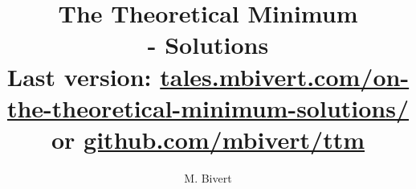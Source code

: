 
\author{M. Bivert}
\title{The Theoretical Minimum \\
	{\Large \vtitle{} - Solutions} \\
	{\footnotesize Last version: %
		\href{https://tales.mbivert.com/on-the-theoretical-minimum-solutions/}%
		{tales.mbivert.com/on-the-theoretical-minimum-solutions/} or %
		\href{https://github.com/mbivert/ttm}{github.com/mbivert/ttm}}
}

\usepackage{subfiles}

\usepackage[margin=1in]{geometry}
\usepackage{hyperref}

\setlength\parindent{0pt}

\usepackage{mathtools}
\usepackage{amsmath}
\usepackage{amsthm}
\usepackage{amsfonts}
\usepackage{bm}
\usepackage{amssymb}

\usepackage{stmaryrd}

\usepackage{float} %

\usepackage{tikz}
\usetikzlibrary{
	snakes,calc,patterns,angles,quotes,
	decorations.pathmorphing,math,
	decorations.pathreplacing,automata,
	arrows.meta,positioning,external
}
\usepackage{pgfplots}
\tikzexternalize[prefix=tikz/]
\pgfplotsset{compat=newest}

\usepackage{bashful}
\usepackage{listings}

\newcommand{\hr}{\noindent\rule{\textwidth}{0.4pt} \\}
\newcommand{\hrr}{\begin{center}\noindent\rule{0.5\textwidth}{0.4pt} \\\end{center}}

\newtheorem{axiom}{Axiom}
\newtheorem{definition}{Definition}
\newtheorem{remark}{Remark}
\newtheorem{theorem}{Theorem}
\newtheorem{lemma}{Lemma}
\newtheorem{exercise}{Exercise}
\newtheorem{example}{Example}

\newcommand{\bra}[1]{\langle #1|}
\newcommand{\ket}[1]{|#1\rangle}
\newcommand{\brah}[1]{\{#1|}
\newcommand{\keit}[1]{|#1\}}
\newcommand{\braket}[2]{\left\langle #1 \middle| #2 \right\rangle}
\newcommand{\ketbra}[2]{\left| #1 \right\rangle\left\langle #2 \right|}
\newcommand{\innerprod}[2]{\left\langle #1 , #2 \right\rangle}
\newcommand{\avg}[1]{\left\langle #1 \right\rangle}
\newcommand{\Tr}{\text{Tr}}
\newcommand\omicron{o}
\newcommand\Omicron{O}
\newcommand{\uvec}[1]{\bm{\hat{#1}}}
\newcommand{\norm}[1]{\lVert #1 \rVert}
\newcommand{\abs}[1]{\lvert #1 \rvert}
\newcommand{\harpoon}{\overset{\rightharpoonup}}
\newcommand{\intint}[1]{\llbracket #1 \rrbracket}

\newcommand{\xtitle}{\title{The Theoretical Minimum \\
	{\Large \vtitle{} - Solutions} \\
	{\large \jobname} \\
	{\footnotesize Last version: %
		\href{https://tales.mbivert.com/on-the-theoretical-minimum-solutions/}%
		{tales.mbivert.com/on-the-theoretical-minimum-solutions/} or %
		\href{https://github.com/mbivert/ttm}{github.com/mbivert/ttm}}
}}
